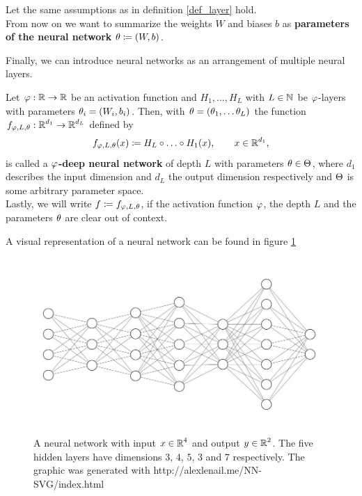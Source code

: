 \begin{remark}
Let the same assumptions as in definition \ref{def_layer} hold.\\ From now on we want to summarize the weights $W$ and biases $b$ as \textbf{parameters of the neural network} $\theta \coloneqq (W, b)$.
\end{remark}
Finally, we can introduce neural networks as an arrangement of multiple neural layers.


\begin{definition}
Let $\operatorname{\varphi}: \operatorname{\mathbb{R}} \to \operatorname{\mathbb{R}}$ be an activation function and $H_1, \ldots, H_L$ with $L \in \operatorname{\mathbb{N}}$ be $\operatorname{\varphi}$-layers with parameters $\theta_i = (W_i, b_i)$. Then, with $\theta = (\theta_1, \ldots \theta_L)$ the function $f_{\operatorname{\varphi}, L, \theta}: \operatorname{\mathbb{R}}^{d_1} \to \operatorname{\mathbb{R}}^{d_L}$ defined by
\begin{align}
f_{\operatorname{\varphi}, L, \theta} (x) \coloneqq H_L \circ \ldots \circ H_1 (x), \qquad x \in \operatorname{\mathbb{R}}^{d_1},
\end{align}
is called a \textbf{$\operatorname{\varphi}$-deep neural network} of depth $L$ with parameters $\theta \in \operatorname{\Theta}$, where $d_1$ describes the input dimension and $d_L$ the output dimension respectively and $\operatorname{\Theta}$ is some arbitrary parameter space.\\
Lastly, we will write $f\coloneqq f_{\operatorname{\varphi}, L, \theta}$, if the activation function $\operatorname{\varphi}$, the depth $L$ and the parameters $\theta$ are clear out of context.
\end{definition}


A visual representation of a neural network can be found in figure \ref{img_nn}


\begin{figure}[H]
\begin{center}
   \begin{minipage}[b]{0.9\linewidth}
      \includegraphics[width=\linewidth]{neural_net}
      \caption{A neural network with input $x\in \operatorname{\mathbb{R}}^4$ and output $y\in\operatorname{\mathbb{R}}^2$. The five hidden layers have dimensions $3$, $4$, $5$, $3$ and $7$ respectively. The graphic was generated with http://alexlenail.me/NN-SVG/index.html}\label{img_nn}
	\end{minipage}
\end{center}
\end{figure}


